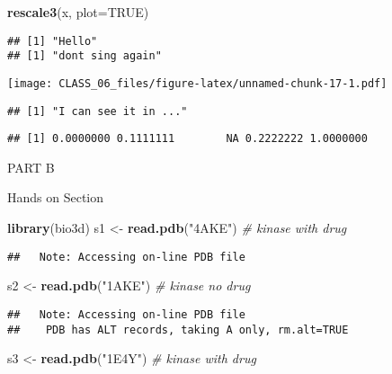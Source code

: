 \documentclass[
]{article}
\newenvironment{Shaded}{\begin{snugshade}}{\end{snugshade}}
\newcommand{\CommentTok}[1]{\textcolor[rgb]{0.56,0.35,0.01}{\textit{#1}}}
\newcommand{\DataTypeTok}[1]{\textcolor[rgb]{0.13,0.29,0.53}{#1}}
\newcommand{\KeywordTok}[1]{\textcolor[rgb]{0.13,0.29,0.53}{\textbf{#1}}}
\newcommand{\NormalTok}[1]{#1}
\newcommand{\OtherTok}[1]{\textcolor[rgb]{0.56,0.35,0.01}{#1}}
\newcommand{\StringTok}[1]{\textcolor[rgb]{0.31,0.60,0.02}{#1}}
\begin{document}
\begin{Shaded}
\begin{Highlighting}[]
\KeywordTok{rescale3}\NormalTok{(x, }\DataTypeTok{plot=}\OtherTok{TRUE}\NormalTok{)}
\end{Highlighting}
\end{Shaded}

\begin{verbatim}
## [1] "Hello"
## [1] "dont sing again"
\end{verbatim}

\texttt{[image: CLASS\_06\_files/figure-latex/unnamed-chunk-17-1.pdf]}

\begin{verbatim}
## [1] "I can see it in ..."
\end{verbatim}

\begin{verbatim}
## [1] 0.0000000 0.1111111        NA 0.2222222 1.0000000
\end{verbatim}

PART B

Hands on Section

\begin{Shaded}
\begin{Highlighting}[]
\KeywordTok{library}\NormalTok{(bio3d)}
\NormalTok{s1 <-}\StringTok{ }\KeywordTok{read.pdb}\NormalTok{(}\StringTok{"4AKE"}\NormalTok{) }\CommentTok{# kinase with drug}
\end{Highlighting}
\end{Shaded}

\begin{verbatim}
##   Note: Accessing on-line PDB file
\end{verbatim}

\begin{Shaded}
\begin{Highlighting}[]
\NormalTok{s2 <-}\StringTok{ }\KeywordTok{read.pdb}\NormalTok{(}\StringTok{"1AKE"}\NormalTok{) }\CommentTok{# kinase no drug}
\end{Highlighting}
\end{Shaded}

\begin{verbatim}
##   Note: Accessing on-line PDB file
##    PDB has ALT records, taking A only, rm.alt=TRUE
\end{verbatim}

\begin{Shaded}
\begin{Highlighting}[]
\NormalTok{s3 <-}\StringTok{ }\KeywordTok{read.pdb}\NormalTok{(}\StringTok{"1E4Y"}\NormalTok{) }\CommentTok{# kinase with drug}
\end{Highlighting}
\end{Shaded}
\end{document}
